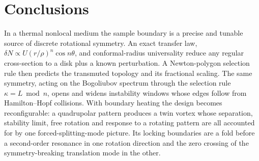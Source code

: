 \hypertarget{conclusions}{%
\section{Conclusions}\label{conclusions}}

In a thermal nonlocal medium the sample boundary is a precise and tunable source of discrete rotational symmetry. An exact transfer law, \(\delta N \propto U (r/\rho)^n \cos n\theta\), and conformal-radius universality reduce any regular cross-section to a disk plus a known perturbation. A Newton-polygon selection rule then predicts the transmuted topology and its fractional scaling. The same symmetry, acting on the Bogoliubov spectrum through the selection rule \(\kappa = L \bmod n\), opens and widens instability windows whose edges follow from Hamilton--Hopf collisions. With boundary heating the design becomes reconfigurable: a quadrupolar pattern produces a twin vortex whose separation, stability limit, free rotation and response to a rotating pattern are all accounted for by one forced-splitting-mode picture. Its locking boundaries are a fold before a second-order resonance in one rotation direction and the zero crossing of the symmetry-breaking translation mode in the other.
